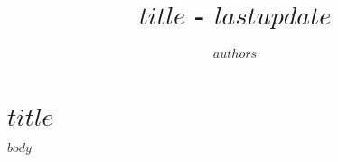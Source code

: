\documentclass{tufte-book}
\title{$title$ - $lastupdate$}
\author{$authors$}
\begin{document}
\chapter{$title$}

$body$
\end{document}
